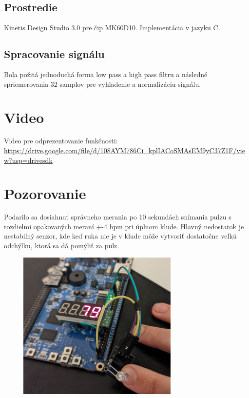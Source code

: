 \documentclass[a4paper,12pt]{article}
\begin{document}
\subsection{Prostredie}
Kinetis Design Studio 3.0 pre čip MK60D10. Implementácia v jazyku C.

\subsection{Spracovanie signálu}
Bola požitá jednoduchá forma low pass\cite{high} a high pass\cite{low} filtru a následné spriemerovania 32 samplov pre vyhladenie a normalizáciu signálu.

\section{Video}
Video pre odprezentovanie funkčnosti:\\
\href{https://drive.google.com/file/d/108AYM786Ci\_kplIACoSMAsEM9yC37Z1F/view\?usp\=drivesdk}{https://drive.google.com/file/d/108AYM786Ci\_kplIACoSMAsEM9yC37Z1F/view?usp=drivesdk}

\section{Pozorovanie}
Podarilo sa dosiahnuť správneho merania po 10 sekundách snímania pulzu s rozdielmi opakovaných meraní +-4 bpm pri úplnom klude. Hlavný nedostatok je nestabilný senzor, kde keď ruka nie je v klude môže vytvoriť dostatočne veľkú odchýlku, ktorá sa dá pomýliť za pulz.

\begin{figure}[htp]
    \centering
    \includegraphics[width=8cm]{img1.jpeg}
    \captionsetup{justification=centering,margin=2cm}
    \label{fig:neighbor_radius}
\end{figure}
\end{document}
